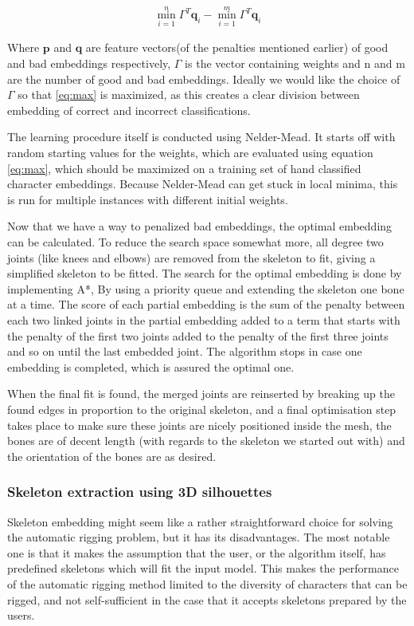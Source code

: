 \documentclass{article}
\begin{document}
\begin{align}
    \min^n_{i = 1} \Gamma^{T} \textbf{q}_i - \min^m_{i = 1} \Gamma^{T}
    \textbf{q}_i  \label{eq:max}
\end{align}

Where $\textbf{p}$ and $\textbf{q}$ are feature vectors(of the penalties
mentioned earlier) of good and bad
embeddings respectively, $\Gamma$ is the vector containing weights and n and m
are the number of good and bad embeddings.
Ideally we would like the choice of $\Gamma$ so that \ref{eq:max} is maximized, 
as this creates a clear division between embedding of correct and incorrect classifications. 

The learning procedure itself is conducted using Nelder-Mead. It starts off with
random starting values for the weights, which are evaluated using equation
\ref{eq:max}, which should be maximized on a training set of hand classified
character embeddings. 
Because Nelder-Mead can get stuck in local minima, this is run for multiple instances with different initial weights.

Now that we have a way to penalized bad embeddings, the optimal embedding can
 be calculated. To reduce the search space somewhat more, all degree two joints
 (like knees and elbows) are removed from the
skeleton to fit, giving a simplified skeleton to be fitted. The search for the
optimal embedding is done by implementing A*, By using a priority
queue and extending the skeleton one bone at a time. The score of each partial
embedding is the sum of the penalty between each two linked joints in the
partial embedding added to a term that starts with the penalty of the first two
joints added to the penalty of the first three joints and so on until the
last embedded joint. The algorithm stops in case
one embedding is completed, which is assured the optimal one.

When the final fit is found, the merged joints are reinserted by breaking up the
found edges in proportion to the original skeleton, and a final optimisation
step takes place to make sure these joints are nicely positioned inside the
mesh, the bones are of decent length (with regards to the skeleton we started
out with) and the orientation of the bones are as desired.

\subsubsection{Skeleton extraction using 3D silhouettes} Skeleton embedding
might seem like a rather straightforward choice for solving the automatic
rigging problem, but it has its disadvantages. The most notable one is that it
makes the assumption that the user, or the algorithm itself, has predefined
skeletons which will fit the input model. This makes the performance of the
automatic rigging method limited to the diversity of characters that can be
rigged, and not self-sufficient in the case that it accepts skeletons prepared
by the users. 
\end{document}
